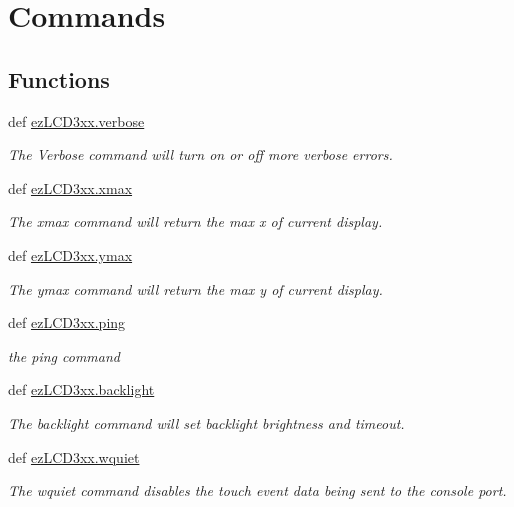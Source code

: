 \hypertarget{group___general}{\section{Commands}
\label{dd/d0a/group___general}
}
\subsection*{Functions}
\begin{DoxyCompactItemize}
\item 
def \hyperlink{group___general_gaa497e8573c045944d589b17fd7dd36ac}{ez\-L\-C\-D3xx.\-verbose}
\begin{DoxyCompactList}\small\item\em The Verbose command will turn on or off more verbose errors. \end{DoxyCompactList}\item 
def \hyperlink{group___general_gabe06f9371514b4556accd06145b9c104}{ez\-L\-C\-D3xx.\-xmax}
\begin{DoxyCompactList}\small\item\em The xmax command will return the max x of current display. \end{DoxyCompactList}\item 
def \hyperlink{group___general_gabcb8010d7c29b1c514e70cefe3bb856c}{ez\-L\-C\-D3xx.\-ymax}
\begin{DoxyCompactList}\small\item\em The ymax command will return the max y of current display. \end{DoxyCompactList}\item 
def \hyperlink{group___general_ga92454899475445ff2d48eb7072f3c94e}{ez\-L\-C\-D3xx.\-ping}
\begin{DoxyCompactList}\small\item\em the ping command \end{DoxyCompactList}\item 
def \hyperlink{group___general_gacecf5c1b5956caef4a4030f51bc4a809}{ez\-L\-C\-D3xx.\-backlight}
\begin{DoxyCompactList}\small\item\em The backlight command will set backlight brightness and timeout. \end{DoxyCompactList}\item 
def \hyperlink{group___general_ga78b38855b8bcb0609d340a80210a0d0f}{ez\-L\-C\-D3xx.\-wquiet}
\begin{DoxyCompactList}\small\item\em The wquiet command disables the touch event data being sent to the console port. \end{DoxyCompactList}\item 

\end{DoxyCompactItemize}
